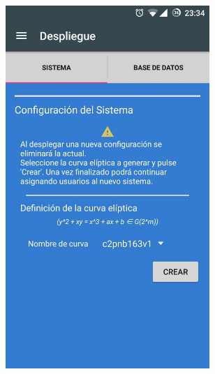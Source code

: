 \documentclass[../PFC.tex]{subfiles}
\begin{document}
\begin{figure}[H]
\centering
	\begin{subfigure}{0.4\textwidth}
		\centering
		\includegraphics[width=0.85\textwidth]{./img/app/despliegueSistema}
    \end{subfigure}          
    \qquad\qquad\qquad  %
    \begin{subfigure}{0.4\textwidth}  
       \centering

\end{subfigure}
\end{figure}
\end{document}
